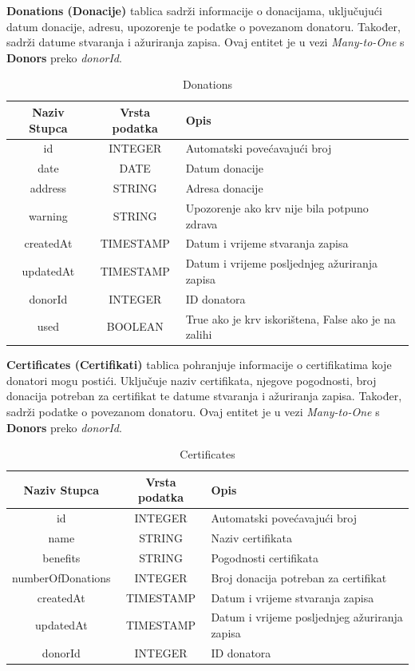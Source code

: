 \noindent
\textbf{Donations (Donacije)} tablica sadrži informacije o donacijama, uključujući
datum donacije, adresu, upozorenje te podatke o povezanom donatoru. Također, sadrži
datume stvaranja i ažuriranja zapisa. Ovaj entitet je u vezi \textit{Many-to-One}
s \textbf{Donors} preko \textit{donorId}.
\begin{table}[H]
	\renewcommand{\arraystretch}{2}
	\centering
	\begin{tabularx}
		{1\textwidth}{|c|c|X|} \hline \textbf{Naziv Stupca} & \textbf{Vrsta
		podatka} & \textbf{Opis} \\ \hline \cellcolor{LightGreen}id & INTEGER & Automatski
		povećavajući broj \\ \hline date & DATE & Datum donacije \\ \hline address
		  & STRING & Adresa donacije \\ \hline warning & STRING & Upozorenje ako krv
		nije bila potpuno zdrava \\ \hline createdAt & TIMESTAMP & Datum i vrijeme
		stvaranja zapisa \\ \hline updatedAt & TIMESTAMP & Datum i vrijeme posljednjeg
		ažuriranja zapisa \\ \hline \cellcolor{LightBlue} donorId & INTEGER & ID
		donatora \\ \hline
		used & BOOLEAN & True ako je krv iskorištena, False ako je na zalihi\\ \hline
	\end{tabularx}
	\caption{Donations}
	\label{tab:my_label}
\end{table}
\clearpage %

\noindent
\textbf{Certificates (Certifikati)} tablica pohranjuje informacije o certifikatima
koje donatori mogu postići. Uključuje naziv certifikata, njegove pogodnosti,
broj donacija potreban za certifikat te datume stvaranja i ažuriranja zapisa. Također,
sadrži podatke o povezanom donatoru. Ovaj entitet je u vezi \textit{Many-to-One}
s \textbf{Donors} preko \textit{donorId}.
\begin{table}[H]
	\renewcommand{\arraystretch}{2}
	\centering
	\begin{tabularx}
		{1\textwidth}{|c|c|X|} \hline \textbf{Naziv Stupca} & \textbf{Vrsta
		podatka} & \textbf{Opis} \\ \hline \cellcolor{LightGreen} id & INTEGER &
		Automatski povećavajući broj \\ \hline name & STRING & Naziv certifikata
		\\ \hline benefits & STRING & Pogodnosti certifikata \\ \hline
		numberOfDonations & INTEGER & Broj donacija potreban za certifikat \\
		\hline createdAt & TIMESTAMP & Datum i vrijeme stvaranja zapisa \\ \hline
		updatedAt & TIMESTAMP & Datum i vrijeme posljednjeg ažuriranja zapisa \\
		\hline \cellcolor{LightBlue} donorId & INTEGER & ID donatora \\ \hline
	\end{tabularx}
	\caption{Certificates}
	\label{tab:my_label}
\end{table}
\clearpage %


